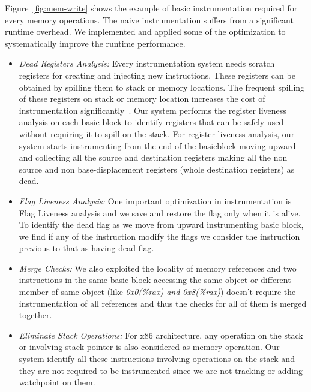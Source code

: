 Figure~\ref{fig:mem-write} shows the example of basic instrumentation required for every memory operations. The naive instrumentation suffers from a significant runtime overhead. We implemented and applied some of the optimization to systematically improve the runtime performance. %
\begin{itemize}
	\item \emph{Dead Registers Analysis:} Every instrumentation system needs scratch registers for creating and injecting new instructions. These registers can be obtained by spilling them to stack or memory locations. %
The frequent spilling of these registers on stack or memory location increases the cost of instrumentation significantly~\cite{Probst02registerliveness, Muth98registerliveness}. Our system performs the register liveness analysis on each basic block to identify registers that can be safely used without requiring it to spill on the stack. For register liveness analysis, our system starts instrumenting from the end of the basicblock moving upward and collecting all the source and destination registers making all the non source and non base-displacement registers (whole destination registers) as dead.  
	\item \emph{Flag Liveness Analysis:} %
One important optimization in instrumentation is Flag Liveness analysis and we save and restore the flag only when it is alive. To identify the dead flag as we move from upward instrumenting basic block, we find if any of the instruction modify the flags we consider the instruction previous to that as having dead flag. 
	\item \emph{Merge Checks:} We also exploited the locality of memory references and two instructions in the same basic block accessing the same object or different member of same object (like \emph{0x0(\%rax) and 0x8(\%rax)}) doesn’t require the instrumentation of all references and thus the checks for all of them is merged together.
    \item \emph{Eliminate Stack Operations:} For x86 architecture, any operation on the stack or involving stack pointer is also considered as memory operation. Our system identify all these instructions involving operations on the stack and they are not required to be instrumented since we are not tracking or adding watchpoint on them.
\end{itemize}

